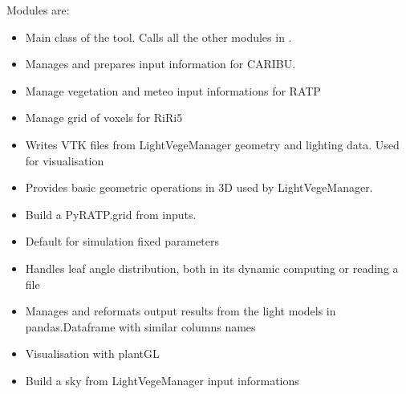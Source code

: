 \documentclass[letterpaper,10pt,english]{sphinxmanual}
\begin{document}
\sphinxAtStartPar
Modules are:
\begin{itemize}
\item {} 
\sphinxAtStartPar
{} Main class of the tool. Calls all the other modules in .

\item {} 
\sphinxAtStartPar
{} Manages and prepares input information for CARIBU.

\item {} 
\sphinxAtStartPar
{} Manage vegetation and meteo input informations for RATP

\item {} 
\sphinxAtStartPar
{} Manage grid of voxels for RiRi5

\item {} 
\sphinxAtStartPar
{} Writes VTK files from LightVegeManager geometry and lighting data. Used for visualisation

\item {} 
\sphinxAtStartPar
{} Provides basic geometric operations in 3D used by LightVegeManager.

\item {} 
\sphinxAtStartPar
{} Build a PyRATP.grid from inputs.

\item {} 
\sphinxAtStartPar
{} Default for simulation fixed parameters

\item {} 
\sphinxAtStartPar
{} Handles leaf angle distribution, both in its dynamic computing or reading a file

\item {} 
\sphinxAtStartPar
{} Manages and reformats output results from the light models in pandas.Dataframe with similar columns names

\item {} 
\sphinxAtStartPar
{} Visualisation with plantGL

\item {} 
\sphinxAtStartPar
{} Build a sky from LightVegeManager input informations


\end{itemize}
\end{document}
